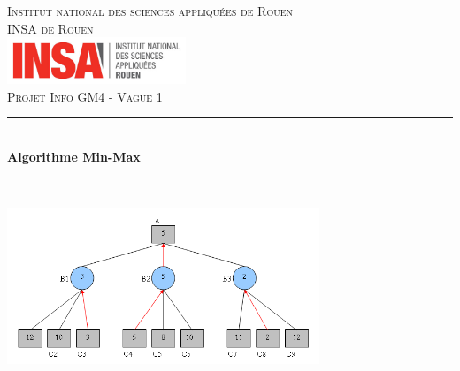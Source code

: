 \documentclass[12,french]{report}
\newcommand{\HRule}{\rule{\linewidth}{0.5mm}}
\begin{document}
\hypersetup{pdfborder=0 0 0}

\begin{titlepage}

\begin{center}
	\textsc{{\LARGE Institut national des sciences appliquées de Rouen} \\ 			\vspace{6mm} {\Large INSA de Rouen}} \\
	\vspace{5mm}
	\includegraphics[width=0.4\textwidth]{./Images/insa}\\[1.0 cm]

	\textsc{\Large Projet Info GM4 - Vague 1}\\[0.6cm]

	\HRule \\[0.5cm]
	{ \Huge \bfseries Algorithme Min-Max}\\[0.2cm]
	\HRule \\[0.75cm]

	\includegraphics[width=0.7\textwidth]{./Images/Page_de_garde}\\[0.9 cm]


\end{center}
\end{titlepage}
\end{document}
